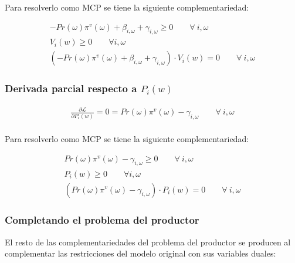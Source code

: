 Para resolverlo como MCP se tiene la siguiente complementariedad:
\begin{footnotesize}
\begin{align}
    -Pr(\omega) \pi^v(\omega) + \beta_{i,\omega}  + \gamma_{i,\omega} \geq 0 \qquad \forall \  i, \omega \\
    V_i(w) \geq 0 \qquad \forall  i,\omega \\
    (-Pr(\omega) \pi^v(\omega) + \beta_{i,\omega}  + \gamma_{i,\omega}) \cdot  V_i(w) = 0  \qquad \forall \  i, \omega 
\end{align}

\end{footnotesize}


\subsubsection{Derivada parcial respecto a $P_i(w)$}
\begin{footnotesize}
\begin{align}
   \frac{\partial \mathcal{L} }{\partial P_i(w)}= 0
   = Pr(\omega) \pi^v(\omega) -\gamma_{i,\omega} \qquad \forall \  i, \omega \\
\end{align}

\end{footnotesize}


Para resolverlo como MCP se tiene la siguiente complementariedad:
\begin{footnotesize}
\begin{align}
    Pr(\omega) \pi^v(\omega) -\gamma_{i,\omega} \geq 0 \qquad \forall \  i, \omega \\
    P_i(w) \geq 0 \qquad \forall  i,\omega \\
    (Pr(\omega) \pi^v(\omega) -\gamma_{i,\omega}) \cdot  P_i(w) = 0  \qquad \forall \  i, \omega 
\end{align}

\end{footnotesize}


\subsubsection{Completando el problema del productor}
El resto de las complementariedades del problema del productor se producen al complementar las restricciones del modelo original con sus variables duales:

